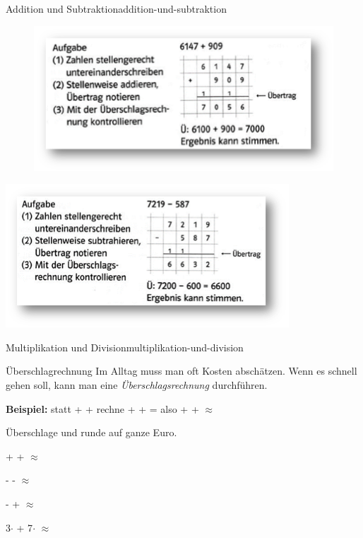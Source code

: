 \documentclass[12pt,a5paper,landscape]{scrartcl}
\begin{document}
	\begin{hilfekarte}{Addition und Subtraktion}{addition-und-subtraktion}
		\begin{figure}		
			\includegraphics[height=.45\textheight]{6.2-LT-Abb_Addition}
		\end{figure}
		
		
		\includegraphics[height=.45\textheight]{6.2-LT-Abb_Subtraktion}
	\end{hilfekarte}
	
	\begin{hilfekarte}{Multiplikation und Division}{multiplikation-und-division}

	\end{hilfekarte}
	
	
	\begin{karte1}{Überschlagrechnung}
	Im Alltag muss man oft Kosten abschätzen. Wenn es schnell gehen soll, kann man eine \emph{Überschlagsrechnung} durchführen.

	\smallskip
	\textbf{Beispiel:} statt  +  +  rechne  +  +  =  also  +  +  $\approx$ 

	\smallskip
	Überschlage und runde auf ganze Euro.
	\begin{enumeratea}
		\item {} +  +  $\approx$ \linie[1cm]
		\item {} -  -  $\approx$ \linie[1cm]
		\item {} -  +  $\approx$ \linie[1cm]
		\item 3$\cdot$  + 7$\cdot$  $\approx$ \linie[1cm]
	\end{enumeratea}
	\end{karte1}
	
\end{document}
